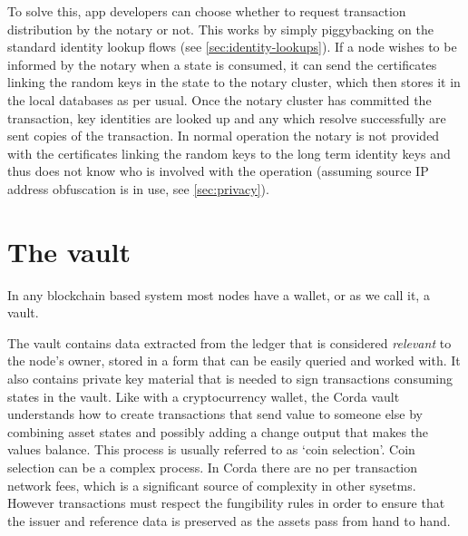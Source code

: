 \documentclass{article}
\begin{document}
To solve this, app developers can choose whether to request transaction distribution by the notary or not. This works
by simply piggybacking on the standard identity lookup flows (see \cref{sec:identity-lookups}). If a node wishes to be
informed by the notary when a state is consumed, it can send the certificates linking the random keys in the state
to the notary cluster, which then stores it in the local databases as per usual. Once the notary cluster has committed
the transaction, key identities are looked up and any which resolve successfully are sent copies of the transaction. In
normal operation the notary is not provided with the certificates linking the random keys to the long term identity keys
and thus does not know who is involved with the operation (assuming source IP address obfuscation is in use, see
\cref{sec:privacy}).

\section{The vault}\label{sec:vault}

In any blockchain based system most nodes have a wallet, or as we call it, a vault.

The vault contains data extracted from the ledger that is considered \emph{relevant} to the node's owner, stored in a form
that can be easily queried and worked with. It also contains private key material that is needed to sign transactions
consuming states in the vault. Like with a cryptocurrency wallet, the Corda vault understands how to create transactions
that send value to someone else by combining asset states and possibly adding a change output that makes the values
balance. This process is usually referred to as `coin selection'. Coin selection can be a complex process. In Corda
there are no per transaction network fees, which is a significant source of complexity in other sysetms. However
transactions must respect the fungibility rules in order to ensure that the issuer and reference data is preserved
as the assets pass from hand to hand.
\end{document}
